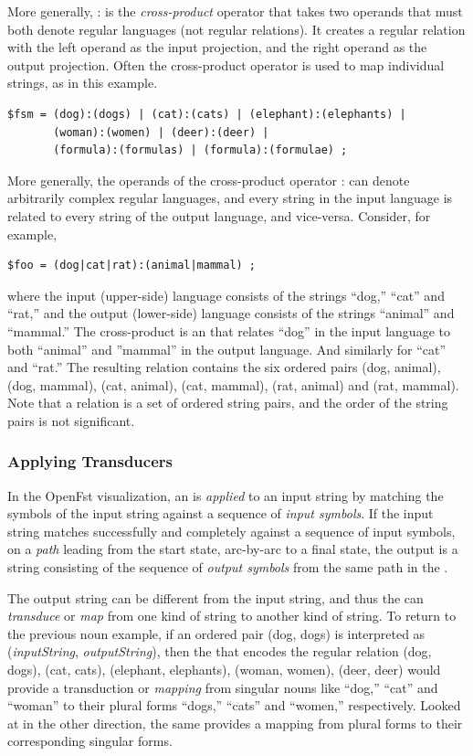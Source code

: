 \noindent
More generally, : is the \emph{cross-product} operator that takes two operands that must
both denote regular languages (not regular relations).  It creates a regular relation with the
left operand as the input projection, and the right operand as the output projection.
Often the cross-product operator is used to map
individual strings, as in this example.


\begin{Verbatim}
$fsm = (dog):(dogs) | (cat):(cats) | (elephant):(elephants) |
       (woman):(women) | (deer):(deer) |
       (formula):(formulas) | (formula):(formulae) ;
\end{Verbatim}


More generally, the operands of the cross-product operator : can denote arbitrarily complex regular languages, 
and every string in the input language is related to every string of the
output language, and vice-versa.  Consider, for example,

\begin{Verbatim}
$foo = (dog|cat|rat):(animal|mammal) ;
\end{Verbatim}

\noindent
where the input (upper-side) language consists of the strings ``dog,'' ``cat'' and ``rat,'' and the output (lower-side)
language consists of the strings ``animal'' and ``mammal.''  The cross-product is an \fst{} that
relates ``dog'' in the input language to both ``animal'' and ''mammal'' in the output
language.  And similarly for ``cat'' and ``rat.''  The resulting relation
contains the six ordered pairs (dog, animal), (dog, mammal), (cat, animal), (cat,
mammal), (rat, animal) and (rat, mammal).  Note that a relation is a set of ordered string
pairs, and the order of the string pairs is not significant.

\subsubsection{Applying Transducers}

In the OpenFst visualization, an \fst{} is \emph{applied} to an input string by
matching the symbols of the input string against a sequence of \emph{input symbols}.  If the input string matches successfully
and completely against a sequence of input symbols, on a \emph{path} leading from the start state,
arc-by-arc to a final state, 
the output is a string consisting of the sequence of \emph{output symbols} from the same path 
in the \fst{}.  

The output string can be different from the input string, and thus
the \fst{} can \emph{transduce} or \emph{map} from one kind of string to another kind of string.  To return to the
previous noun example, if an ordered pair (dog, dogs) is interpreted as (\emph{inputString},
\emph{outputString}),
then the \fst{} that encodes the regular relation { (dog, dogs), (cat, cats), (elephant,
elephants), (woman, women), (deer, deer)} would provide a transduction or \emph{mapping}
from singular nouns like ``dog,'' ``cat'' and ``woman'' to their plural forms ``dogs,''
``cats'' and ``women,'' respectively.  Looked at in the other direction,
the same \fst{} provides a mapping from plural forms to their
corresponding singular forms.


